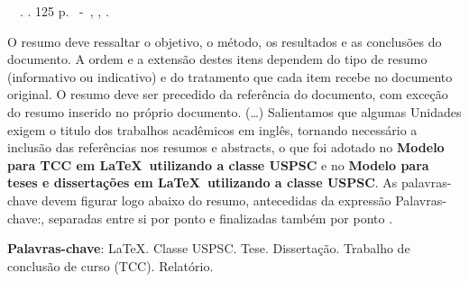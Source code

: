 \setlength{\absparsep}{18pt} %
\begin{resumo}
	\begin{flushleft} 
			\setlength{\absparsep}{0pt} %
			\SingleSpacing 
			\imprimirautorabr~~\textbf{\imprimirtituloresumo}.	\imprimirdata. 125 p. 
			\imprimirtipotrabalho~-~\imprimirinstituicao, \imprimirlocal, \imprimirdata. 
 	\end{flushleft}
\OnehalfSpacing 			
 O resumo deve ressaltar o  objetivo, o método, os resultados e as conclusões do documento. A ordem e a extensão  destes itens dependem do tipo de resumo (informativo ou indicativo) e do  tratamento que cada item recebe no documento original. O resumo deve ser
 precedido da referência do documento, com exceção do resumo inserido no
 próprio documento. (\ldots)  Salientamos que algumas Unidades exigem o titulo dos trabalhos acadêmicos em inglês, tornando necessário a inclusão das referências nos resumos e abstracts, o que foi adotado no \textbf{Modelo para TCC em \LaTeX\ utilizando a classe USPSC} e no \textbf{Modelo para teses e dissertações em \LaTeX\ utilizando a classe USPSC}. As palavras-chave devem figurar logo abaixo do  resumo, antecedidas da expressão Palavras-chave:, separadas entre si por  ponto e finalizadas também por ponto \cite{nbr6028}.
 

 \textbf{Palavras-chave}: LaTeX. Classe USPSC. Tese. Dissertação. Trabalho de conclusão de curso (TCC). Relatório.
\end{resumo}
